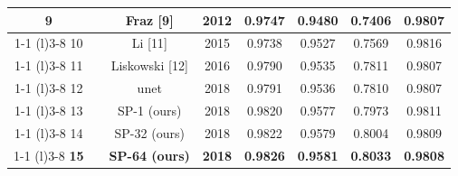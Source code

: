 \documentclass{article}
\begin{document}
\begin{appendices}
\begin{table}[h]
\begin{tabular}{@{}cccccccc@{}}
9 &                                        & Fraz {[}9{]}            & 2012          & 0.9747          & 0.9480          & 0.7406          & 0.9807          \\ \cmidrule(r){1-1} \cmidrule(l){3-8} 
10 &                                        & Li {[}11{]}              & 2015          & 0.9738          & 0.9527          & 0.7569          & 0.9816          \\ \cmidrule(r){1-1} \cmidrule(l){3-8} 
11 &                                        & Liskowski {[}12{]}       & 2016          & 0.9790          & 0.9535          & 0.7811          & 0.9807          \\ \cmidrule(r){1-1} \cmidrule(l){3-8} 
12 &                                        & unet       & 2018          & 0.9791          & 0.9536          & 0.7810          & 0.9807          \\ \cmidrule(r){1-1} \cmidrule(l){3-8} 
13 &                                        & SP-1 (ours)                     & 2018          & 0.9820          & 0.9577          & 0.7973          & 0.9811          \\ \cmidrule(r){1-1} \cmidrule(l){3-8} 
14 &                                        & SP-32 (ours)                    & 2018          & 0.9822          & 0.9579          & 0.8004          & 0.9809          \\ \cmidrule(r){1-1} \cmidrule(l){3-8} 
\textbf{15} &                                        & \textbf{SP-64 (ours)} & \textbf{2018} & \textbf{0.9826} & \textbf{0.9581} & \textbf{0.8033} & \textbf{0.9808} \\ \bottomrule
\end{tabular}
\end{table}


\end{appendices}
\end{document}
